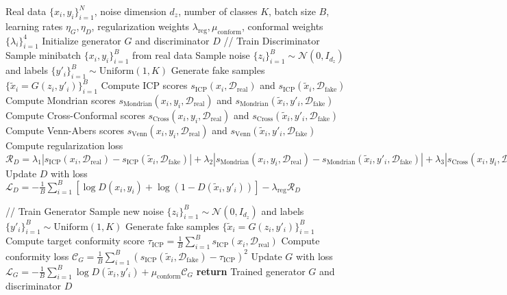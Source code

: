 \documentclass{article}
\theoremstyle{plain}
\theoremstyle{definition}
\theoremstyle{remark}
\begin{document}
\begin{algorithm}
\caption{Conformalized GAN Training}
\begin{algorithmic}[1]
\REQUIRE Real data $\{x_i, y_i\}_{i=1}^N$, noise dimension $d_z$, number of classes $K$, batch size $B$, learning rates $\eta_G, \eta_D$, regularization weights $\lambda_{\text{reg}}, \mu_{\text{conform}}$, conformal weights $\{\lambda_i\}_{i=1}^4$
\STATE Initialize generator $G$ and discriminator $D$
    \STATE // Train Discriminator
    \STATE Sample minibatch $\{x_i, y_i\}_{i=1}^B$ from real data
    \STATE Sample noise $\{z_i\}_{i=1}^B \sim \mathcal{N}(0, I_{d_z})$ and labels $\{y'_i\}_{i=1}^B \sim \text{Uniform}(1, K)$
    \STATE Generate fake samples $\{\tilde{x}_i = G(z_i, y'_i)\}_{i=1}^B$
    \STATE Compute ICP scores $s_{\text{ICP}}(x_i, \mathcal{D}_{\text{real}})$ and $s_{\text{ICP}}(\tilde{x}_i, \mathcal{D}_{\text{fake}})$
    \STATE Compute Mondrian scores $s_{\text{Mondrian}}(x_i, y_i, \mathcal{D}_{\text{real}})$ and $s_{\text{Mondrian}}(\tilde{x}_i, y'_i, \mathcal{D}_{\text{fake}})$
    \STATE Compute Cross-Conformal scores $s_{\text{Cross}}(x_i, y_i, \mathcal{D}_{\text{real}})$ and $s_{\text{Cross}}(\tilde{x}_i, y'_i, \mathcal{D}_{\text{fake}})$
    \STATE Compute Venn-Abers scores $s_{\text{Venn}}(x_i, y_i, \mathcal{D}_{\text{real}})$ and $s_{\text{Venn}}(\tilde{x}_i, y'_i, \mathcal{D}_{\text{fake}})$
    \STATE Compute regularization loss $\mathcal{R}_D = \lambda_1 |s_{\text{ICP}}(x_i, \mathcal{D}_{\text{real}}) - s_{\text{ICP}}(\tilde{x}_i, \mathcal{D}_{\text{fake}})| + \lambda_2 |s_{\text{Mondrian}}(x_i, y_i, \mathcal{D}_{\text{real}}) - s_{\text{Mondrian}}(\tilde{x}_i, y'_i, \mathcal{D}_{\text{fake}})| + \lambda_3 |s_{\text{Cross}}(x_i, y_i, \mathcal{D}_{\text{real}}) - s_{\text{Cross}}(\tilde{x}_i, y'_i, \mathcal{D}_{\text{fake}})| + \lambda_4 |s_{\text{Venn}}(x_i, y_i, \mathcal{D}_{\text{real}}) - s_{\text{Venn}}(\tilde{x}_i, y'_i, \mathcal{D}_{\text{fake}})|$
    \STATE Update $D$ with loss $\mathcal{L}_D = -\frac{1}{B}\sum_{i=1}^B[\log D(x_i, y_i) + \log(1 - D(\tilde{x}_i, y'_i))] - \lambda_{\text{reg}} \mathcal{R}_D$
    
    \STATE // Train Generator
    \STATE Sample new noise $\{z_i\}_{i=1}^B \sim \mathcal{N}(0, I_{d_z})$ and labels $\{y'_i\}_{i=1}^B \sim \text{Uniform}(1, K)$
    \STATE Generate fake samples $\{\tilde{x}_i = G(z_i, y'_i)\}_{i=1}^B$
    \STATE Compute target conformity score $\tau_{\text{ICP}} = \frac{1}{B}\sum_{i=1}^B s_{\text{ICP}}(x_i, \mathcal{D}_{\text{real}})$
    \STATE Compute conformity loss $\mathcal{C}_G = \frac{1}{B}\sum_{i=1}^B (s_{\text{ICP}}(\tilde{x}_i, \mathcal{D}_{\text{fake}}) - \tau_{\text{ICP}})^2$
    \STATE Update $G$ with loss $\mathcal{L}_G = -\frac{1}{B}\sum_{i=1}^B \log D(\tilde{x}_i, y'_i) + \mu_{\text{conform}} \mathcal{C}_G$
\ENDFOR
\STATE \textbf{return} Trained generator $G$ and discriminator $D$
\end{algorithmic}
\end{algorithm}
\end{document}
